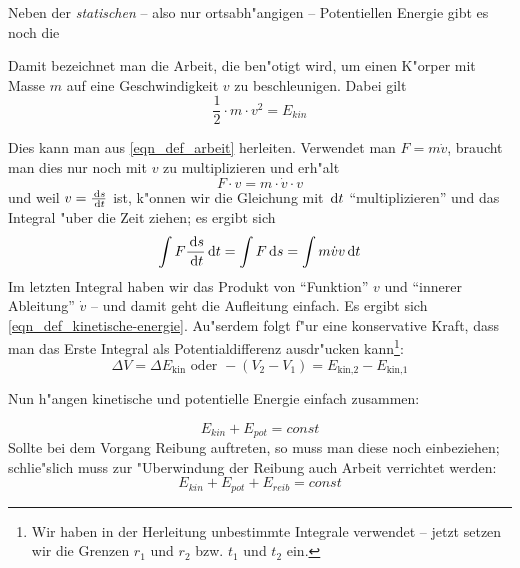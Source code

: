\abs
Neben der \emph{statischen} -- also nur ortsabh"angigen -- Potentiellen
Energie gibt es noch die 
\begin{Def}
   \label{def_kinetische-energie}
Damit bezeichnet man die Arbeit, die ben"otigt wird, um einen K"orper
mit Masse $m$ auf eine Geschwindigkeit $v$ zu beschleunigen. Dabei
gilt
\begin{equation}
   \label{eqn_def_kinetische-energie}
   \boxed{
       \frac{1}{2} \cdot m \cdot v^2 = E_{kin}
   }
\end{equation}
\end{Def}
Dies kann man aus \eqref{eqn_def_arbeit} herleiten. Verwendet man $F =
m \dot v$, braucht man dies nur noch mit $v$ zu multiplizieren und
erh"alt
\begin{equation*}
   F \cdot v = m \cdot \dot v \cdot v
\end{equation*}
und weil $v = \frac{\, \mathrm{d} s}{\, \mathrm{d} t}$ ist, k"onnen wir die Gleichung
mit $\, \mathrm{d} t$ "`multiplizieren"' und das Integral "uber die Zeit
ziehen; es ergibt sich
\begin{equation*}
   \int F \frac{\, \mathrm{d} s}{\, \mathrm{d} t} \, \mathrm{d} t = \int F \, \mathrm{d} s = 
\int m \dot v v \, \mathrm{d} t
\end{equation*}
Im letzten Integral haben wir das Produkt von "`Funktion"' $v$ und
"`innerer Ableitung"' $\dot v$ -- und damit geht die Aufleitung
einfach. Es ergibt sich \eqref{eqn_def_kinetische-energie}. Au"serdem
folgt f"ur eine konservative Kraft, dass man das Erste Integral als
Potentialdifferenz ausdr"ucken kann\footnote{Wir haben in der
  Herleitung unbestimmte Integrale verwendet -- jetzt setzen wir die
  Grenzen $r_1$ und $r_2$ bzw. $t_1$ und $t_2$ ein.}:
\begin{equation*}
   \Delta V  = \Delta E_\text{kin} \text{ oder } -(V_2 - V_1) = 
   E_\text{kin,2} - E_\text{kin,1}
\end{equation*}


Nun h"angen kinetische und potentielle Energie einfach zusammen:
\begin{Wichtig}[Energieerhaltung]
\label{def_energieerhaltung}
\begin{equation}
   \label{eqn_energieerhaltung_mechanik}
   \boxed{
     E_{kin} + E_{pot} = const
}
\end{equation}
Sollte bei dem Vorgang Reibung auftreten, so muss man diese noch
einbeziehen; schlie"slich muss zur "Uberwindung der Reibung auch Arbeit
verrichtet werden:
$$
   E_{kin} + E_{pot} + E_{reib} = const
$$
\end{Wichtig}
















